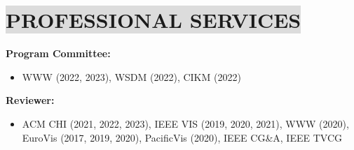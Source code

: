 \section*{
    \colorbox{gainsboro}{PROFESSIONAL SERVICES}
}
\textbf{Program Committee:}
\vspace{-3mm}
\begin{itemize}[leftmargin=5mm,noitemsep,itemsep=0pt]
    \item WWW (2022, 2023), WSDM (2022), CIKM (2022)
\end{itemize}

\textbf{Reviewer:}
\vspace{-3mm}
\begin{itemize}[leftmargin=5mm,noitemsep,itemsep=0pt]
    \item ACM CHI (2021, 2022, 2023), IEEE VIS (2019, 2020, 2021), WWW (2020), EuroVis (2017, 2019, 2020), PacificVis (2020), IEEE CG\&A, IEEE TVCG
\end{itemize}

